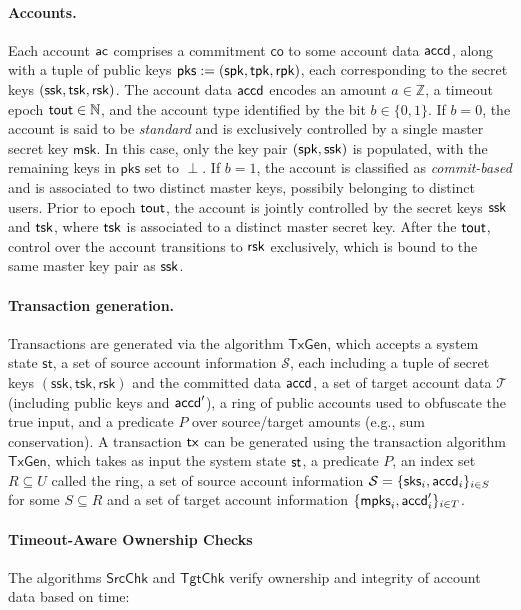 \paragraph*{Accounts.}
Each account $\mathsf{ac}$ comprises a commitment $\mathsf{co}$ to some account data $\mathsf{accd}$, along with a tuple of public keys $\mathsf{pks} := ( \mathsf{spk}, \mathsf{tpk}, \mathsf{rpk} )$, each corresponding to the secret keys  $( \mathsf{ssk}, \mathsf{tsk}, \mathsf{rsk} )$. The account data $\mathsf{accd}$ encodes an amount $a \in \mathbb{Z}$, a timeout epoch $\mathsf{tout} \in \mathbb{N}$, and the account type identified by the bit $b \in \{ 0, 1 \}$. If $b = 0$, the account is said to be \textit{standard} and is exclusively controlled by a single master secret key $\mathsf{msk}$. In this case, only the key pair $(\mathsf{spk}, \mathsf{ssk})$ is populated, with the remaining keys in $\mathsf{pks}$ set to $\perp$. If $b = 1$, the account is classified as \textit{commit-based} and is associated to two distinct master keys, possibily belonging to distinct users. Prior to epoch $\mathsf{tout}$, the account is jointly controlled by the secret keys $\mathsf{ssk}$ and $\mathsf{tsk}$, where $\mathsf{tsk}$ is associated to a distinct master secret key. After the $\mathsf{tout}$, control over the account transitions to  $\mathsf{rsk}$ exclusively, which is bound to the same master key pair as $\mathsf{ssk}$.

\paragraph*{Transaction generation.} Transactions are generated via the algorithm $\mathsf{TxGen}$, which accepts a system state $\mathsf{st}$, a set of source account information $\mathcal{S}$, each including a tuple of secret keys $(\mathsf{ssk}, \mathsf{tsk}, \mathsf{rsk})$ and the committed data $\mathsf{accd}$, a set of target account data $\mathcal{T}$ (including public keys and $\mathsf{accd}'$), a ring of public accounts used to obfuscate the true input, and a predicate $P$ over source/target amounts (e.g., sum conservation).
A transaction $\mathsf{tx}$ can be generated using the transaction algorithm $\mathsf{TxGen}$, which takes as input the system state $\st$, a predicate $P$, an index set $R \subseteq U$ called the ring, a set of source account information $\mathcal{S} = \{ \mathsf{sks}_i, \mathsf{accd}_i \}_{i \in S}$ for some $S \subseteq R$ and a set of target account information $\{ \mathsf{mpks}_i, \mathsf{accd}'_i \}_{i \in T}$.

\paragraph*{Timeout-Aware Ownership Checks}
The algorithms $\mathsf{SrcChk}$ and $\mathsf{TgtChk}$ verify ownership and integrity of account data based on time:

